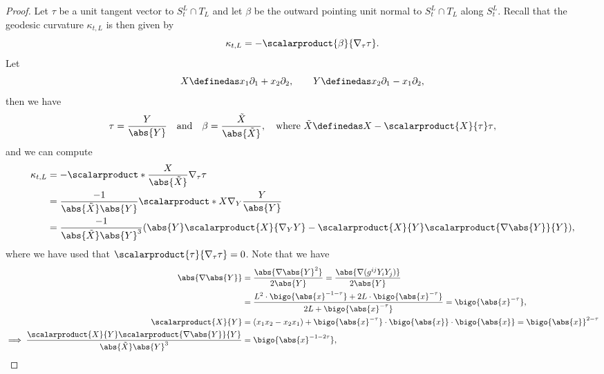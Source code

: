 \documentclass[titlepage,numbers=noenddot,oneside,%
cleardoublepage=empty,paper=a4,fontsize=11pt,%
english,%
]{scrartcl}
\begin{document}
\begin{proof}
    Let \( \tau \) be a unit tangent vector to \( S_t^L\cap T_L \) and let \( \beta \) be the outward pointing unit normal to \( S_t^L\cap T_L \) along \( S_t^L \). Recall that the geodesic curvature \( \kappa_{t,L} \) is then given by 
    \begin{equation*}
        \kappa_{t,L}=-\scalarproduct{\beta}{\nabla_{\tau}\tau}.
    \end{equation*}
    Let
    \begin{equation*}
        X\definedas x_1 \partial_1+x_2 \partial_2,\qquad Y\definedas x_2 \partial_1-x_1 \partial_2,
    \end{equation*}
    then we have
    \begin{equation*}
        \tau=\frac{Y}{\abs{Y}}\quad \text{and}\quad \beta=\frac{\tilde{X}}{\abs{\tilde{X}}},\quad \text{where \( \tilde{X}\definedas X-\scalarproduct{X}{\tau}\tau \)},
    \end{equation*}
    and we can compute
    \begin{equation*}
       \kappa_{t,L}\begin{aligned}[t]
            &=-\scalarproduct*{\frac{X}{\abs{\tilde{X}}}}{\nabla_{\tau}\tau}\\
            &=\frac{-1}{\abs{\tilde{X}}\abs{Y}}\scalarproduct*{X}{\nabla_Y\frac{Y}{\abs{Y}}}\\
            &=\frac{-1}{\abs{\tilde{X}}\abs{Y}^3}(\abs{Y}\scalarproduct{X}{\nabla_Y Y}-\scalarproduct{X}{Y}\scalarproduct{\nabla\abs{Y}}{Y}),
        \end{aligned}
    \end{equation*}
    where we have used that \( \scalarproduct{\tau}{\nabla_{\tau}\tau}=0 \). Note that we have
    \begin{align*}
        \abs{\nabla\abs{Y}}&\begin{aligned}[t]
            &=\frac{\abs{\nabla \abs{Y}^2}}{2\abs{Y}}=\frac{\abs{\nabla(g^{ij}Y_i Y_j)}}{2\abs{Y}}\\
            &=\frac{L^2 \cdot \bigo{\abs{x}^{-1-\tau}}+2L\cdot \bigo{\abs{x}^{-\tau}}}{2L+\bigo{\abs{x}^{-\tau}}}=\bigo{\abs{x}^{-\tau}},
        \end{aligned}\\
        \scalarproduct{X}{Y}&=(x_1x_2-x_2x_1)+\bigo{\abs{x}^{-\tau}}\cdot\bigo{\abs{x}}\cdot \bigo{\abs{x}}=\bigo{\abs{x}}^{2-\tau}\\
        \implies \frac{\scalarproduct{X}{Y}\scalarproduct{\nabla\abs{Y}}{Y}}{\abs{\tilde{X}}\abs{Y}^3}&=\bigo{\abs{x}^{-1-2\tau}},\\

\end{align*}
\end{proof}
\end{document}

